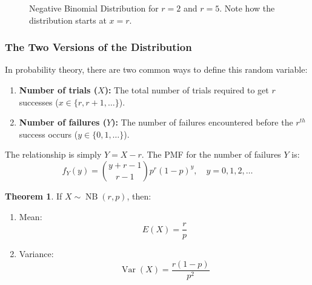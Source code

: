 \documentclass[12pt,a4paper]{report}
\theoremstyle{definition}
\newtheorem{thm}{Theorem}[section]
\theoremstyle{plain}
\theoremstyle{definition}
\begin{document}
\begin{figure}[H]
    \centering
    \caption{Negative Binomial Distribution for $r=2$ and $r=5$. Note how the distribution starts at $x=r$.}
\end{figure}












\subsubsection{The Two Versions of the Distribution} In probability theory, there are two common ways to define this random variable:
\begin{enumerate}
\item \textbf{Number of trials ($X$):} The total number of trials required to get $r$ successes ($x \in \{r, r+1, \dots\}$).
\item \textbf{Number of failures ($Y$):} The number of failures encountered before the $r^{th}$ success occurs ($y \in \{0, 1, \dots\}$).
\end{enumerate}
The relationship is simply $Y = X - r$. The PMF for the number of failures $Y$ is:\[ f_Y(y) = \binom{y+r-1}{r-1} p^r (1-p)^y, \quad y = 0, 1, 2, \dots \]




\begin{thm}
If $X \sim \operatorname{NB}(r, p)$, then:
\begin{enumerate}
\item Mean: \[E(X) = \frac{r}{p}\]
\item Variance: \[\operatorname{Var}(X) = \frac{r(1-p)}{p^2}\]
\end{enumerate}
\end{thm}
\end{document}
